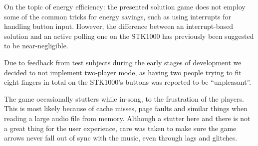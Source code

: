 On the topic of energy efficiency: the presented solution game does not employ some of the common tricks for energy savings, such as using interrupts for handling button input.
However, the difference between an interrupt-based solution and an active polling one on the STK1000 has previously been suggested to be near-negligible\cite{tdt4258-1}.

	Due to feedback from test subjects during the early stages of development we decided to not implement two-player mode, as having two people trying to fit eight fingers in total on the STK1000's buttons was reported to be ``unpleasant''.
	
	The game occasionally stutters while in-song, to the frustration of the players. This is most likely because of cache misses, page faults and similar things when reading a large audio file from memory.
    Although a stutter here and there is not a great thing for the user experience, care was taken to make sure the game arrows never fall out of sync with the music, even through lags and glitches.
